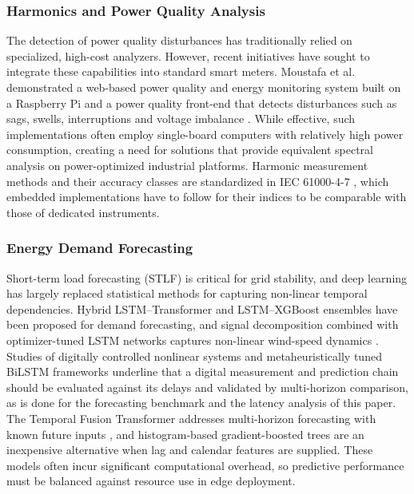 \documentclass[fleqn,10pt]{wlscirep}
\begin{document}
\subsubsection{Harmonics and Power Quality Analysis}
The detection of power quality disturbances has traditionally relied on specialized, high-cost analyzers. However, recent initiatives have sought to integrate these capabilities into standard smart meters. Moustafa et al. demonstrated a web-based power quality and energy monitoring system built on a Raspberry Pi and a power quality front-end that detects disturbances such as sags, swells, interruptions and voltage imbalance \cite{Moustafa2025PQ}. While effective, such implementations often employ single-board computers with relatively high power consumption, creating a need for solutions that provide equivalent spectral analysis on power-optimized industrial platforms. Harmonic measurement methods and their accuracy classes are standardized in IEC 61000-4-7 \cite{iec61000_4_7}, which embedded implementations have to follow for their indices to be comparable with those of dedicated instruments.

\subsubsection{Energy Demand Forecasting}
Short-term load forecasting (STLF) is critical for grid stability, and deep learning has largely replaced statistical methods for capturing non-linear temporal dependencies. Hybrid LSTM--Transformer \cite{HybridLSTMTrans2025} and LSTM--XGBoost ensembles \cite{HybridLSTMXGB2025} have been proposed for demand forecasting, and signal decomposition combined with optimizer-tuned LSTM networks captures non-linear wind-speed dynamics \cite{Altan2021wind, Baris2024wind}. Studies of digitally controlled nonlinear systems \cite{Yanarates2023delay} and metaheuristically tuned BiLSTM frameworks \cite{Avci2026sdg6} underline that a digital measurement and prediction chain should be evaluated against its delays and validated by multi-horizon comparison, as is done for the forecasting benchmark and the latency analysis of this paper. The Temporal Fusion Transformer addresses multi-horizon forecasting with known future inputs \cite{Lim2021tft}, and histogram-based gradient-boosted trees \cite{Ke2017lightgbm} are an inexpensive alternative when lag and calendar features are supplied. These models often incur significant computational overhead, so predictive performance must be balanced against resource use in edge deployment.
\end{document}
